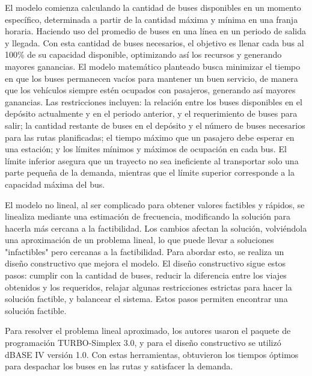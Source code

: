 \documentclass[preprint,11pt]{elsarticle}
\begin{document}
El modelo comienza calculando la cantidad de buses disponibles en un momento específico, determinada a partir de la cantidad máxima y mínima en una franja horaria. Haciendo uso del promedio de buses en una línea en un periodo de salida y llegada. Con esta cantidad de buses necesarios, el objetivo es llenar cada bus al 100\% de su capacidad disponible, optimizando así los recursos y generando mayores ganancias. El modelo matemático planteado busca minimizar el tiempo en que los buses permanecen vacíos para mantener un buen servicio, de manera que los vehículos siempre estén ocupados con pasajeros, generando así mayores ganancias. Las restricciones incluyen: la relación entre los buses disponibles en el depósito actualmente y en el periodo anterior, y el requerimiento de buses para salir; la cantidad restante de buses en el depósito y el número de buses necesarios para las rutas planificadas; el tiempo máximo que un pasajero debe esperar en una estación; y los límites mínimos y máximos de ocupación en cada bus. El límite inferior asegura que un trayecto no sea ineficiente al transportar solo una parte pequeña de la demanda, mientras que el límite superior corresponde a la capacidad máxima del bus.

El modelo no lineal, al ser complicado para obtener valores factibles y rápidos, se linealiza mediante una estimación de frecuencia, modificando la solución para hacerla más cercana a la factibilidad. Los cambios afectan la solución, volviéndola una aproximación de un problema lineal, lo que puede llevar a soluciones "infactibles" pero cercanas a la factibilidad. Para abordar esto, se realiza un diseño constructivo que mejora el modelo. El diseño constructivo sigue estos pasos: cumplir con la cantidad de buses, reducir la diferencia entre los viajes obtenidos y los requeridos, relajar algunas restricciones estrictas para hacer la solución factible, y balancear el sistema. Estos pasos permiten encontrar una solución factible.

Para resolver el problema lineal aproximado, los autores usaron el paquete de programación TURBO-Simplex 3.0, y para el diseño constructivo se utilizó dBASE IV versión 1.0. Con estas herramientas, obtuvieron los tiempos óptimos para despachar los buses en las rutas y satisfacer la demanda.
\end{document}
